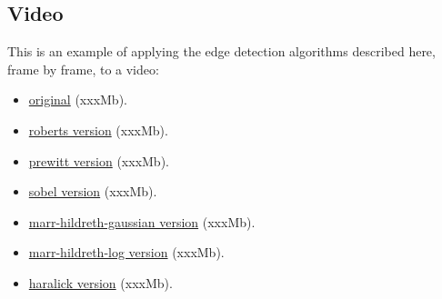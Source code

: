 \documentclass{ipol}
\numberwithin{equation}{section}
\numberwithin{table}{section}
\numberwithin{figure}{section}
\begin{document}
\subsection{Video}


This is an example of applying the edge detection algorithms described here, frame by frame, to a video: 
\begin{itemize}
	\centering
	\item \href{http://iie.fing.edu.uy/~haldos/ipol/video.mov}{original} (xxxMb).
\end{itemize}
\begin{multicols}{2}
\begin{itemize}
	\item \href{http://iie.fing.edu.uy/~haldos/ipol/video-roberts.mov}{roberts version} (xxxMb).
	\item \href{http://iie.fing.edu.uy/~haldos/ipol/video-prewitt.mov}{prewitt version} (xxxMb).
	\item \href{http://iie.fing.edu.uy/~haldos/ipol/video-sobel.mov}{sobel version} (xxxMb).
	\item \href{http://iie.fing.edu.uy/~haldos/ipol/video-marr-hildreth-gaussian.mov}{marr-hildreth-gaussian version} (xxxMb).
	\item \href{http://iie.fing.edu.uy/~haldos/ipol/video-marr-hildreth-log.mov}{marr-hildreth-log version} (xxxMb).
	\item \href{http://iie.fing.edu.uy/~haldos/ipol/video-haralick.mov}{haralick version} (xxxMb).
\end{itemize}
\end{multicols}

\begin{thebibliography}{9}

\end{thebibliography}
\end{document}
